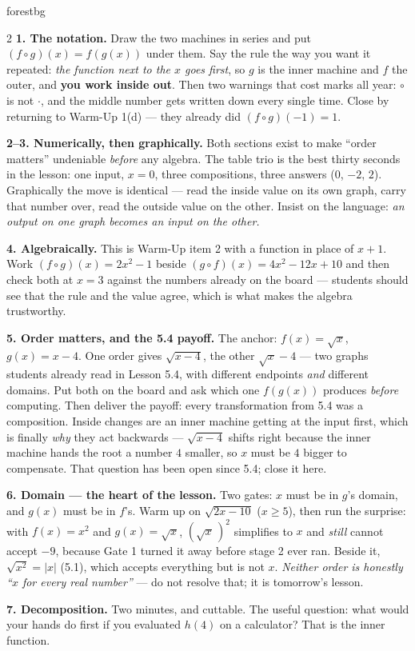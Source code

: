 \documentclass[10pt]{article}
\begin{document}
\begin{skillbox}[Lesson]{forestbg}
\begin{multicols}{2}
\textbf{1. The notation.} Draw the two machines in series and put $(f\circ g)(x)=f(g(x))$ under
them. Say the rule the way you want it repeated: \emph{the function next to the $x$ goes first}, so
$g$ is the inner machine and $f$ the outer, and \textbf{you work inside out}. Then two warnings that
cost marks all year: $\circ$ is not $\cdot$, and the middle number gets written down every single
time. Close by returning to Warm-Up 1(d) --- they already did $(f\circ g)(-1)=1$.

\textbf{2--3. Numerically, then graphically.} Both sections exist to make ``order matters''
undeniable \emph{before} any algebra. The table trio is the best thirty seconds in the lesson: one
input, $x=0$, three compositions, three answers ($0$, $-2$, $2$). Graphically the move is identical
--- read the inside value on its own graph, carry that number over, read the outside value on the
other. Insist on the language: \emph{an output on one graph becomes an input on the other.}

\textbf{4. Algebraically.} This is Warm-Up item 2 with a function in place of $x+1$. Work
$(f\circ g)(x)=2x^{2}-1$ beside $(g\circ f)(x)=4x^{2}-12x+10$ and then check both at $x=3$ against
the numbers already on the board --- students should see that the rule and the value agree, which is
what makes the algebra trustworthy.

\columnbreak

\textbf{5. Order matters, and the 5.4 payoff.} The anchor: $f(x)=\sqrt{x}$, $g(x)=x-4$. One order
gives $\sqrt{x-4}$, the other $\sqrt{x}-4$ --- two graphs students already read in Lesson 5.4, with
different endpoints \emph{and} different domains. Put both on the board and ask which one
$f(g(x))$ produces \emph{before} computing. Then deliver the payoff: every transformation from 5.4
was a composition. Inside changes are an inner machine getting at the input first, which is finally
\emph{why} they act backwards --- $\sqrt{x-4}$ shifts right because the inner machine hands the root
a number $4$ smaller, so $x$ must be $4$ bigger to compensate. That question has been open since
5.4; close it here.

\textbf{6. Domain --- the heart of the lesson.} Two gates: $x$ must be in $g$'s domain, and $g(x)$
must be in $f$'s. Warm up on $\sqrt{2x-10}$ ($x\ge5$), then run the surprise: with $f(x)=x^{2}$ and
$g(x)=\sqrt{x}$, $\left(\sqrt{x}\,\right)^{2}$ simplifies to $x$ and \emph{still} cannot accept
$-9$, because Gate 1 turned it away before stage 2 ever ran. Beside it, $\sqrt{x^{2}}=|x|$ (5.1),
which accepts everything but is not $x$. \emph{Neither order is honestly ``$x$ for every real
number''} --- do not resolve that; it is tomorrow's lesson.

\textbf{7. Decomposition.} Two minutes, and cuttable. The useful question: what would your hands do
first if you evaluated $h(4)$ on a calculator? That is the inner function.
\end{multicols}
\end{skillbox}
\end{document}
